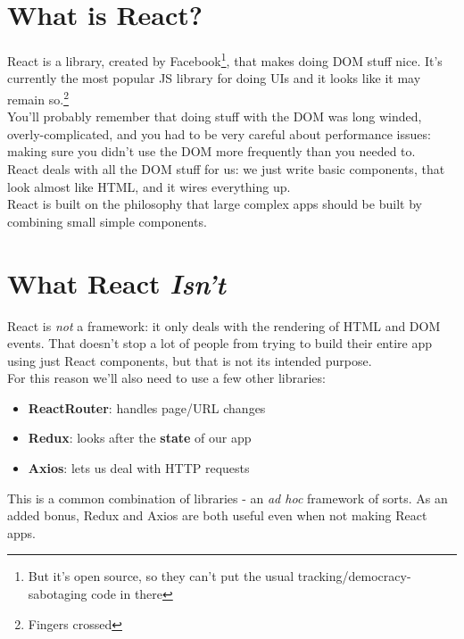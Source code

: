 \section{What is React?}


React is a library, created by Facebook\footnote{But it's open source, so they can't put the usual tracking/democracy-sabotaging code in there}, that makes doing DOM stuff nice. It's currently the most popular JS library for doing UIs and it looks like it may remain so.\footnote{Fingers crossed}
\\

You'll probably remember that doing stuff with the DOM was long winded, overly-complicated, and you had to be very careful about performance issues: making sure you didn't use the DOM more frequently than you needed to.
\\

React deals with all the DOM stuff for us: we just write basic components, that look almost like HTML, and it wires everything up.
\\

React is built on the philosophy that large complex apps should be built by combining small simple components.

\section{What React \textit{Isn't}}

React is \textit{not} a framework: it only deals with the rendering of HTML and DOM events. That doesn't stop a lot of people from trying to build their entire app using just React components, but that is not its intended purpose.
\\

For this reason we'll also need to use a few other libraries:

\begin{itemize}
    \item \textbf{ReactRouter}: handles page/URL changes
    \item \textbf{Redux}: looks after the \textbf{state} of our app
    \item \textbf{Axios}: lets us deal with HTTP requests
\end{itemize}

This is a common combination of libraries - an \textit{ad hoc} framework of sorts. As an added bonus, Redux and Axios are both useful even when not making React apps.
\\


